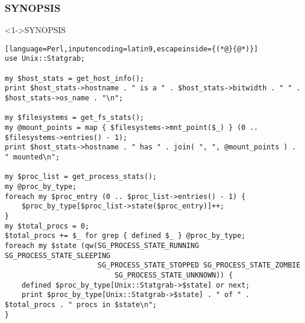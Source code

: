 \documentclass[ngerman,xcolor={table,dvipsnames},smaller,compress,hyperref={bookmarks,colorlinks}]{beamer}
\begin{document}
\begin{frame}[fragile]
\frametitle{SYNOPSIS}
\begin{block}<1->{SYNOPSIS}
\tiny
\begin{lstlisting}[language=Perl,inputencoding=latin9,escapeinside={(*@}{@*)}]
use Unix::Statgrab;

my $host_stats = get_host_info();
print $host_stats->hostname . " is a " . $host_stats->bitwidth . " " . $host_stats->os_name . "\n";

my $filesystems = get_fs_stats();
my @mount_points = map { $filesystems->mnt_point($_) } (0 .. $filesystems->entries() - 1);
print $host_stats->hostname . " has " . join( ", ", @mount_points ) . " mounted\n";

my $proc_list = get_process_stats();
my @proc_by_type;
foreach my $proc_entry (0 .. $proc_list->entries() - 1) {
    $proc_by_type[$proc_list->state($proc_entry)]++;
}
my $total_procs = 0;
$total_procs += $_ for grep { defined $_ } @proc_by_type;
foreach my $state (qw(SG_PROCESS_STATE_RUNNING SG_PROCESS_STATE_SLEEPING
                      SG_PROCESS_STATE_STOPPED SG_PROCESS_STATE_ZOMBIE
		      		      SG_PROCESS_STATE_UNKNOWN)) {
    defined $proc_by_type[Unix::Statgrab->$state] or next;
    print $proc_by_type[Unix::Statgrab->$state] . " of " . $total_procs . " procs in $state\n";
}
\end{lstlisting}
\end{block}
\end{frame}
\end{document}
